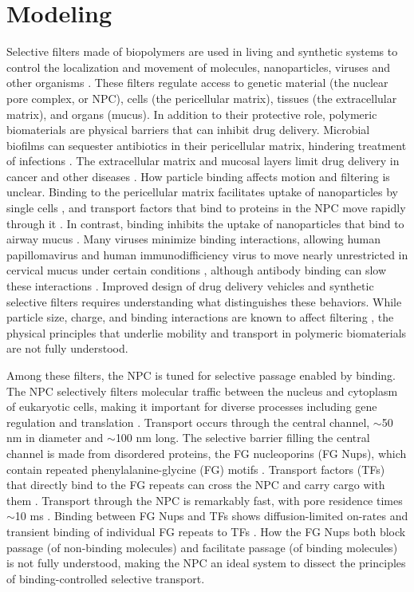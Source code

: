 \chapter{Modeling}\label{ch02}

Selective filters made of biopolymers are used in living and
synthetic systems to control the localization and movement of
molecules, nanoparticles, viruses and other organisms \cite{witten17}.
These filters regulate access to genetic material (the nuclear pore
complex, or NPC), cells (the pericellular matrix), tissues (the
extracellular matrix), and organs (mucus). In addition to their
protective role, polymeric biomaterials are physical barriers that can
inhibit drug delivery. Microbial biofilms can sequester antibiotics in
their pericellular matrix, hindering treatment of infections
\cite{hoiby10}. The extracellular matrix and mucosal layers limit drug
delivery in cancer and other diseases \cite{witten17}. How particle
binding affects motion and filtering is unclear. Binding to the
pericellular matrix facilitates uptake of nanoparticles by single
cells \cite{zhou12}, and transport factors that bind to proteins in
the NPC move rapidly through it \cite{strambio-de-castillia10}.  In
contrast, binding inhibits the uptake of nanoparticles that bind to
airway mucus \cite{schneider17, huang17, mastorakos15}. Many viruses
minimize binding interactions, allowing human papillomavirus and human
immunodifficiency virus to move nearly unrestricted in cervical mucus
under certain conditions \cite{olmsted01,lai09}, although antibody binding 
can slow these interactions \cite{chen14}.  Improved design of
drug delivery vehicles and synthetic selective filters requires
understanding what distinguishes these behaviors.  While particle
size, charge, and binding interactions are known to affect filtering
\cite{witten17}, the physical principles that underlie mobility and
transport in polymeric biomaterials are not fully understood.

Among these filters, the NPC is tuned for selective passage enabled by
binding.  The NPC selectively filters molecular traffic between the
nucleus and cytoplasm of eukaryotic cells, making it important for
diverse processes including gene regulation and translation
\cite{strambio-de-castillia10}. Transport occurs through the central
channel, $\sim$50 nm in diameter and $\sim$100 nm long. The selective
barrier filling the central channel is made from disordered proteins,
the FG nucleoporins (FG Nups), which contain repeated
phenylalanine-glycine (FG) motifs .  Transport
factors (TFs) that directly bind to the FG repeats can cross the NPC
and carry cargo with them \cite{strambio-de-castillia10}.  Transport
through the NPC is remarkably fast, with pore residence times $\sim$10
ms \cite{yang04}.  Binding between FG Nups and TFs shows
diffusion-limited on-rates and transient binding of individual FG
repeats to TFs \cite{milles15, hough15}.  How the FG Nups both block
passage (of non-binding molecules) and facilitate passage (of binding
molecules) is not fully understood, making the NPC an ideal system to
dissect the principles of binding-controlled selective transport.

